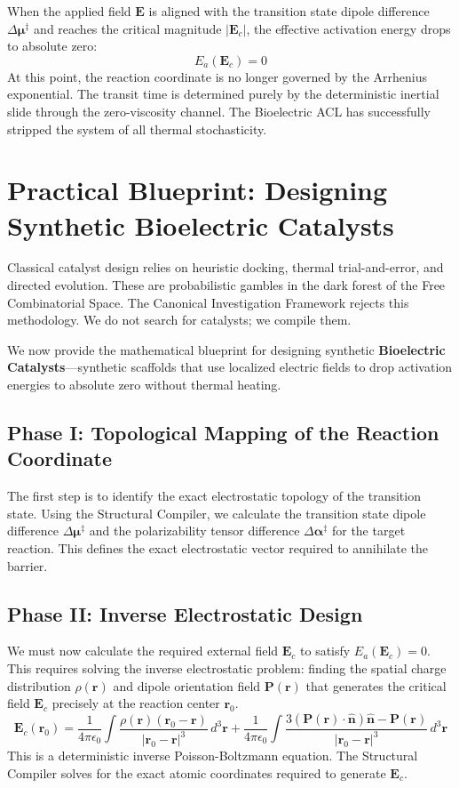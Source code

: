 \documentclass[11pt,openany]{extbook}
\theoremstyle{plain}
\theoremstyle{definition}
\begin{document}
When the applied field $\mathbf{E}$ is aligned with the transition state dipole difference $\Delta \boldsymbol{\mu}^{\ddagger}$ and reaches the critical magnitude $|\mathbf{E}_c|$, the effective activation energy drops to absolute zero:
\[
E_a(\mathbf{E}_c) = 0
\]
At this point, the reaction coordinate is no longer governed by the Arrhenius exponential. The transit time is determined purely by the deterministic inertial slide through the zero-viscosity channel. The Bioelectric ACL has successfully stripped the system of all thermal stochasticity.

\section{Practical Blueprint: Designing Synthetic Bioelectric Catalysts}

Classical catalyst design relies on heuristic docking, thermal trial-and-error, and directed evolution. These are probabilistic gambles in the dark forest of the Free Combinatorial Space. The Canonical Investigation Framework rejects this methodology. We do not search for catalysts; we compile them.

We now provide the mathematical blueprint for designing synthetic \textbf{Bioelectric Catalysts}---synthetic scaffolds that use localized electric fields to drop activation energies to absolute zero without thermal heating.

\subsection{Phase I: Topological Mapping of the Reaction Coordinate}
The first step is to identify the exact electrostatic topology of the transition state. Using the Structural Compiler, we calculate the transition state dipole difference $\Delta \boldsymbol{\mu}^{\ddagger}$ and the polarizability tensor difference $\Delta \boldsymbol{\alpha}^{\ddagger}$ for the target reaction. This defines the exact electrostatic vector required to annihilate the barrier.

\subsection{Phase II: Inverse Electrostatic Design}
We must now calculate the required external field $\mathbf{E}_c$ to satisfy $E_a(\mathbf{E}_c) = 0$. This requires solving the inverse electrostatic problem: finding the spatial charge distribution $\rho(\mathbf{r})$ and dipole orientation field $\mathbf{P}(\mathbf{r})$ that generates the critical field $\mathbf{E}_c$ precisely at the reaction center $\mathbf{r}_0$.
\[
\mathbf{E}_c(\mathbf{r}_0) = \frac{1}{4\pi\epsilon_0} \int \frac{\rho(\mathbf{r})(\mathbf{r}_0 - \mathbf{r})}{|\mathbf{r}_0 - \mathbf{r}|^3} \, d^3\mathbf{r} + \frac{1}{4\pi\epsilon_0} \int \frac{3(\mathbf{P}(\mathbf{r}) \cdot \hat{\mathbf{n}})\hat{\mathbf{n}} - \mathbf{P}(\mathbf{r})}{|\mathbf{r}_0 - \mathbf{r}|^3} \, d^3\mathbf{r}
\]
This is a deterministic inverse Poisson-Boltzmann equation. The Structural Compiler solves for the exact atomic coordinates required to generate $\mathbf{E}_c$.
\end{document}
